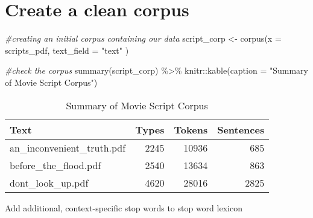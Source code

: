 \documentclass[
]{article}
\newenvironment{Shaded}{\begin{snugshade}}{\end{snugshade}}
\newcommand{\AttributeTok}[1]{\textcolor[rgb]{0.77,0.63,0.00}{#1}}
\newcommand{\CommentTok}[1]{\textcolor[rgb]{0.56,0.35,0.01}{\textit{#1}}}
\newcommand{\FunctionTok}[1]{\textcolor[rgb]{0.00,0.00,0.00}{#1}}
\newcommand{\NormalTok}[1]{#1}
\newcommand{\OtherTok}[1]{\textcolor[rgb]{0.56,0.35,0.01}{#1}}
\newcommand{\SpecialCharTok}[1]{\textcolor[rgb]{0.00,0.00,0.00}{#1}}
\newcommand{\StringTok}[1]{\textcolor[rgb]{0.31,0.60,0.02}{#1}}
\begin{document}
\hypertarget{create-a-clean-corpus}{%
\section{Create a clean corpus}\label{create-a-clean-corpus}}

\begin{Shaded}
\begin{Highlighting}[]
\CommentTok{\#creating an initial corpus containing our data}
\NormalTok{script\_corp }\OtherTok{\textless{}{-}} \FunctionTok{corpus}\NormalTok{(}\AttributeTok{x =}\NormalTok{ scripts\_pdf, }\AttributeTok{text\_field =} \StringTok{"text"}\NormalTok{ )}

\CommentTok{\#check the corpus }
\FunctionTok{summary}\NormalTok{(script\_corp) }\SpecialCharTok{\%\textgreater{}\%} 
\NormalTok{  knitr}\SpecialCharTok{::}\FunctionTok{kable}\NormalTok{(}\AttributeTok{caption =} \StringTok{"Summary of Movie Script Corpus"}\NormalTok{)}
\end{Highlighting}
\end{Shaded}

\begin{table}

\caption{\label{tab:unnamed-chunk-2}Summary of Movie Script Corpus}
\centering
\begin{tabular}[t]{l|r|r|r}
\hline
Text & Types & Tokens & Sentences\\
\hline
an\_inconvenient\_truth.pdf & 2245 & 10936 & 685\\
\hline
before\_the\_flood.pdf & 2540 & 13634 & 863\\
\hline
dont\_look\_up.pdf & 4620 & 28016 & 2825\\
\hline
\end{tabular}
\end{table}

Add additional, context-specific stop words to stop word lexicon

\begin{Shaded}
\end{Shaded}
\end{document}

